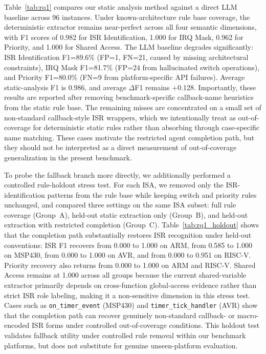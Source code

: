 \documentclass[a4paper,UKenglish,cleveref, autoref, thm-restate]{lipics-v2021}
\begin{document}
Table~\ref{tab:rq1} compares our static analysis method against a direct LLM baseline across 96 instances. Under known-architecture rule base coverage, the deterministic extractor remains near-perfect across all four semantic dimensions, with F1 scores of 0.982 for ISR Identification, 1.000 for IRQ Mask, 0.962 for Priority, and 1.000 for Shared Access. The LLM baseline degrades significantly: ISR Identification F1=89.6\% (FP=1, FN=21, caused by missing architectural constraints), IRQ Mask F1=81.7\% (FP=24 from hallucinated switch operations), and Priority F1=80.0\% (FN=9 from platform-specific API failures). Average static-analysis F1 is 0.986, and average $\Delta$F1 remains +0.128. Importantly, these results are reported after removing benchmark-specific callback-name heuristics from the static rule base. The remaining misses are concentrated on a small set of non-standard callback-style ISR wrappers, which we intentionally treat as out-of-coverage for deterministic static rules rather than absorbing through case-specific name matching. These cases motivate the restricted agent completion path, but they should not be interpreted as a direct measurement of out-of-coverage generalization in the present benchmark.

To probe the fallback branch more directly, we additionally performed a controlled rule-holdout stress test. For each ISA, we removed only the ISR-identification patterns from the rule base while keeping switch and priority rules unchanged, and compared three settings on the same ISA subset: full rule coverage (Group~A), held-out static extraction only (Group~B), and held-out extraction with restricted completion (Group~C). Table~\ref{tab:rq1_holdout} shows that the completion path substantially restores ISR recognition under held-out conventions: ISR F1 recovers from 0.000 to 1.000 on ARM, from 0.585 to 1.000 on MSP430, from 0.000 to 1.000 on AVR, and from 0.000 to 0.951 on RISC-V. Priority recovery also returns from 0.000 to 1.000 on ARM and RISC-V. Shared Access remains at 1.000 across all groups because the current shared-variable extractor primarily depends on cross-function global-access evidence rather than strict ISR role labeling, making it a non-sensitive dimension in this stress test. Cases such as \texttt{on\_timer\_event} (MSP430) and \texttt{timer\_tick\_handler} (AVR) show that the completion path can recover genuinely non-standard callback- or macro-encoded ISR forms under controlled out-of-coverage conditions. This holdout test validates fallback utility under controlled rule removal within our benchmark platforms, but does not substitute for genuine unseen-platform evaluation.
\end{document}
